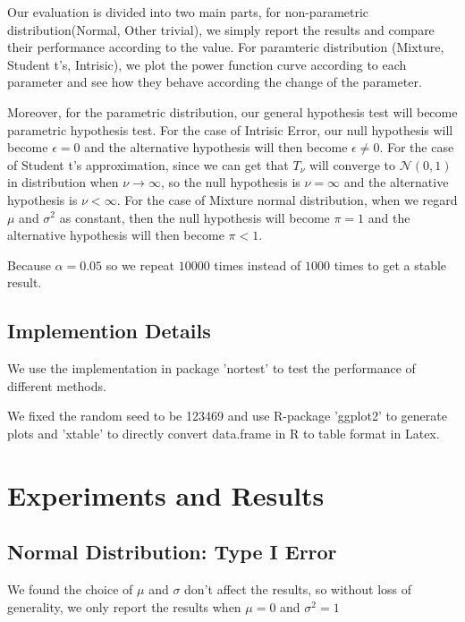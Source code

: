 \documentclass[twoside]{article}
\begin{document}
Our evaluation is divided into two main parts, for non-parametric distribution(Normal, Other trivial), we simply report the results and compare their performance according to the value. For paramteric distribution (Mixture, Student t's, Intrisic), we plot the power function curve according to each parameter and see how they behave according the change of the parameter.

Moreover, for the parametric distribution, our general hypothesis test will become parametric hypothesis test. For the case of Intrisic Error, our null hypothesis will become $\epsilon = 0$ and the alternative hypothesis will then become $\epsilon \neq 0$. For the case of Student t's approximation, since we can get that $T_\nu$ will converge to $\mathcal{N}(0, 1)$ in distribution when $\nu \to \infty$, so the null hypothesis  is $\nu = \infty$ and the alternative hypothesis is $\nu < \infty$. For the case of Mixture normal distribution, when we regard $\mu$ and $\sigma^2$ as constant, then the null hypothesis will become $\pi = 1$ and the alternative hypothesis will then become $\pi < 1$.

Because $\alpha=0.05$ so we repeat $10000$ times instead of $1000$ times to get a stable result.

\subsection{Implemention Details}

We use the implementation in package 'nortest' to test the performance of different methods.

We fixed the random seed to be 123469 and use R-package 'ggplot2' to generate plots and 'xtable' to directly convert data.frame in R to table format in Latex.

\section{Experiments and Results}

\subsection{Normal Distribution: Type I Error}

We found the choice of $\mu$ and $\sigma$ don't affect the results, so without loss of generality, we only report the results when $\mu=0$ and $\sigma^2=1$
\end{document}
